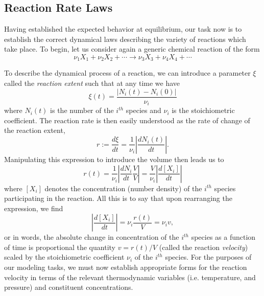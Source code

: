 \subsection{Reaction Rate Laws}

Having established the expected behavior at equilibrium, our task now is to establish the correct dynamical laws describing the variety of reactions which take place. To begin, let us consider again a generic chemical reaction of the form
\begin{equation}
  \nu_{1}X_1 + \nu_{2}X_2 + \cdots \longrightarrow \nu_{3}X_3 + \nu_{4}X_4 + \cdots
\end{equation}

To describe the dynamical process of a reaction, we can introduce a parameter $\xi$ called the \textit{reaction extent} such that at any time we have
\begin{equation}
  \xi(t) = \frac{\lvert N_i(t) - N_i(0) \rvert}{ \nu_i}
\end{equation}
where $N_i(t)$ is the number  of the $i^{th}$ species and $\nu_i$ is the stoichiometric coefficient. The reaction rate is then easily understood as the rate of change of the reaction extent,
\begin{equation}
  r := \frac{d\xi}{dt} = \frac{1}{\nu_i}\left\lvert \frac{dN_i(t)} { dt} \right\rvert.
\end{equation}
Manipulating this expression to introduce the volume then leads us to
\begin{equation}
  r(t) = \frac{1}{\nu_i}\left\lvert\frac{dN_i}{dt}\frac{V}{V} \right\rvert = \frac{V}{\nu_i}\left\lvert \frac{d[X_i]}{dt} \right\rvert
\end{equation}
where $[X_i]$ denotes the concentration (number density) of the $i^{th}$ species participating in the reaction. All this is to say that upon rearranging the expression, we find
\begin{equation}
  \left\lvert \frac{d[X_i]}{dt} \right\rvert = \nu_i\frac{r(t)}{V} = \nu_iv,
\end{equation}
or in words, the absolute change in concentration of the $i^{th}$ species as a function of time is proportional the quantity $v=r(t)/V$ (called the reaction \textit{velocity}) scaled by the stoichiometric coefficient $\nu_i$ of the $i^{th}$ species. For the purposes of our modeling tasks, we must now establish appropriate forms for the reaction velocity in terms of the relevant thermodynamic variables (i.e. temperature, and pressure) and constituent concentrations.

